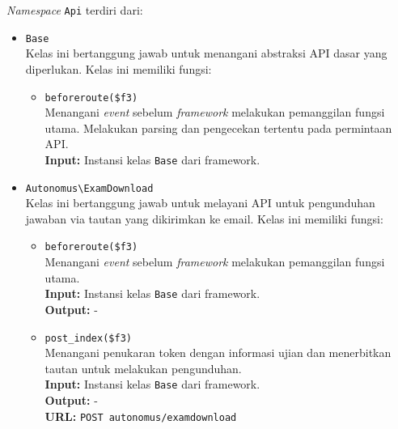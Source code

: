     \textit{Namespace} \texttt{Api} terdiri dari:
    \begin{itemize}
        \item \texttt{Base} \\
            Kelas ini bertanggung jawab untuk menangani abstraksi API dasar yang
            diperlukan. Kelas ini memiliki fungsi:
            \begin{itemize}
                \item \texttt{beforeroute(\$f3)} \\
                    Menangani \textit{event} sebelum \textit{framework}
                    melakukan pemanggilan fungsi utama. Melakukan parsing dan
                    pengecekan tertentu pada permintaan API.\\
                    \textbf{Input:} Instansi kelas \texttt{Base} dari
                    framework.
            \end{itemize}
    
        \item \texttt{Autonomus\textbackslash ExamDownload} \\
            Kelas ini bertanggung jawab untuk melayani API untuk pengunduhan
            jawaban via tautan yang dikirimkan ke email. Kelas ini memiliki
            fungsi:
            \begin{itemize}
                \item \texttt{beforeroute(\$f3)} \\
                    Menangani \textit{event} sebelum \textit{framework}
                    melakukan pemanggilan fungsi utama.\\
                    \textbf{Input:} Instansi kelas \texttt{Base} dari
                    framework.\\
                    \textbf{Output:} -
                
                \item \texttt{post\_index(\$f3)} \\
                    Menangani penukaran token dengan informasi ujian dan
                    menerbitkan tautan untuk melakukan pengunduhan.\\
                    \textbf{Input:} Instansi kelas \texttt{Base} dari
                    framework.\\
                    \textbf{Output:} - \\
                    \textbf{URL:} \texttt{POST autonomus/examdownload}
                

\end{itemize}
\end{itemize}
